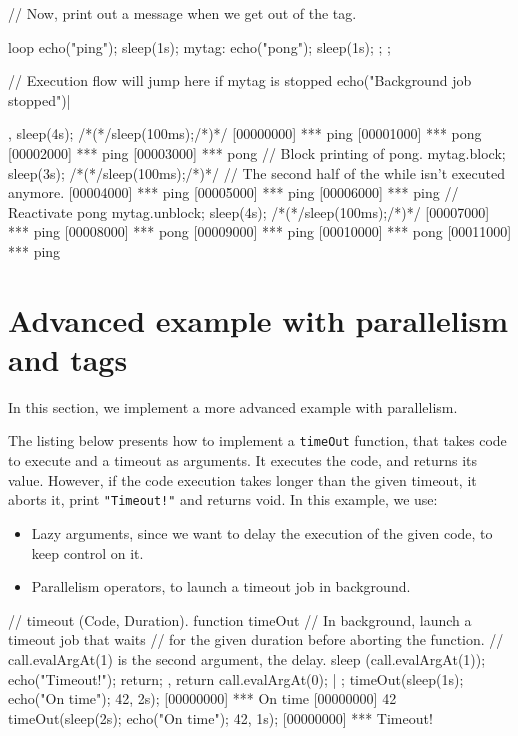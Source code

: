 \begin{urbiscript}
// Now, print out a message when we get out of the tag.
{
  loop
  {
    echo("ping"); sleep(1s);
    mytag: { echo("pong"); sleep(1s); };
  };

  // Execution flow will jump here if mytag is stopped
  echo("Background job stopped")|
},
sleep(4s);
/*(*/sleep(100ms);/*)*/
[00000000] *** ping
[00001000] *** pong
[00002000] *** ping
[00003000] *** pong
// Block printing of pong.
mytag.block;
sleep(3s);
/*(*/sleep(100ms);/*)*/
// The second half of the while isn't executed anymore.
[00004000] *** ping
[00005000] *** ping
[00006000] *** ping
// Reactivate pong
mytag.unblock;
sleep(4s);
/*(*/sleep(100ms);/*)*/
[00007000] *** ping
[00008000] *** pong
[00009000] *** ping
[00010000] *** pong
[00011000] *** ping
\end{urbiscript}

\section{Advanced example with parallelism and tags}

In this section, we implement a more advanced example with
parallelism.

The listing below presents how to implement a \lstinline{timeOut}
function, that takes code to execute and a timeout as arguments. It
executes the code, and returns its value. However, if the code
execution takes longer than the given timeout, it aborts it, print
\lstinline|"Timeout!"| and returns void. In this example, we use:

\begin{itemize}
\item Lazy arguments, since we want to delay the execution of the
  given code, to keep control on it.
\item Parallelism operators, to launch a timeout job in background.
\end{itemize}

\begin{urbiscript}
// timeout (Code, Duration).
function timeOut
{
  // In background, launch a timeout job that waits
  // for the given duration before aborting the function.
  // call.evalArgAt(1) is the second argument, the delay.
  {
    sleep (call.evalArgAt(1));
    echo("Timeout!");
    return;
  },
  return call.evalArgAt(0);
} | {};
timeOut({sleep(1s); echo("On time"); 42}, 2s);
[00000000] *** On time
[00000000] 42
timeOut({sleep(2s); echo("On time"); 42}, 1s);
[00000000] *** Timeout!
\end{urbiscript}

